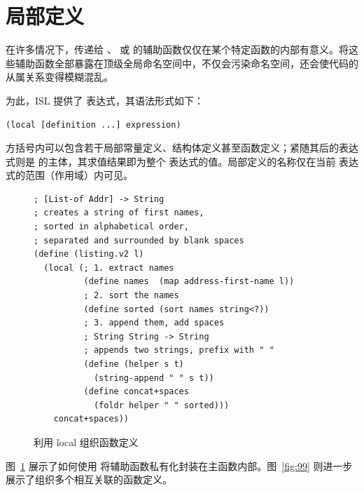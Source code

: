 \section{局部定义}
\label{sec:16_2}

在许多情况下，传递给 、 或  的辅助函数仅仅在某个特定函数的内部有意义。将这些辅助函数全部暴露在顶级全局命名空间中，不仅会污染命名空间，还会使代码的从属关系变得模糊混乱。

为此，ISL 提供了  表达式，其语法形式如下：

\begin{lstlisting}[language=BSL]
(local [definition ...] expression)
\end{lstlisting}

方括号内可以包含若干局部常量定义、结构体定义甚至函数定义；紧随其后的表达式则是  的主体，其求值结果即为整个  表达式的值。局部定义的名称仅在当前  表达式的范围（作用域）内可见。

\begin{figure}[htbp]
  \centering
\begin{lstlisting}[language=BSL, basicstyle=\scriptsize\ttfamily]
; [List-of Addr] -> String
; creates a string of first names,
; sorted in alphabetical order,
; separated and surrounded by blank spaces
(define (listing.v2 l)
  (local (; 1. extract names
          (define names  (map address-first-name l))
          ; 2. sort the names
          (define sorted (sort names string<?))
          ; 3. append them, add spaces
          ; String String -> String
          ; appends two strings, prefix with " "
          (define (helper s t)
            (string-append " " s t))
          (define concat+spaces
            (foldr helper " " sorted)))
    concat+spaces))
\end{lstlisting}
  \caption{利用 local 组织函数定义}
  \label{fig:98}
\end{figure}

图~\ref{fig:98} 展示了如何使用  将辅助函数私有化封装在主函数内部。图~\ref{fig:99} 则进一步展示了组织多个相互关联的函数定义。

